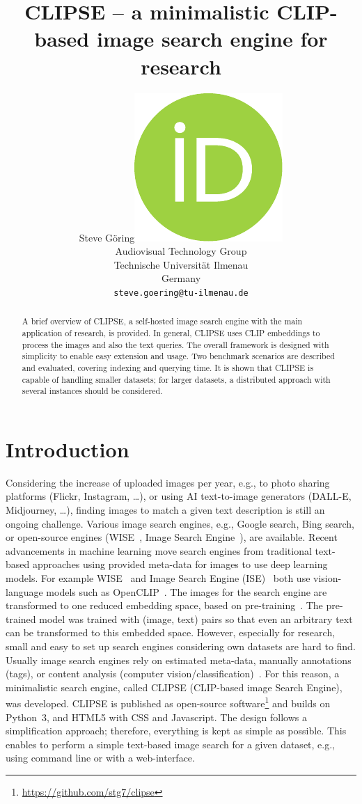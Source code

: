 \documentclass{article}
\title{CLIPSE -- a minimalistic CLIP-based image search engine for research}
\author{ Steve Göring\hspace{1mm}\href{https://orcid.org/0000-0001-6810-6969}{\includegraphics[scale=0.06]{orcid.pdf}}\\
    Audiovisual Technology Group\\
    Technische Universität Ilmenau\\
    Germany \\
    \texttt{steve.goering@tu-ilmenau.de} \\
}
\begin{document}
\maketitle

\begin{abstract}
A brief overview of CLIPSE, a self-hosted image search engine with the main application of research, is provided.
In general, CLIPSE uses CLIP embeddings to process the images and also the text queries.
The overall framework is designed with simplicity to enable easy extension and usage.
Two benchmark scenarios are described and evaluated, covering indexing and querying time.
It is shown that CLIPSE is capable of handling smaller datasets; for larger datasets, a distributed approach with several instances should be considered.
\end{abstract}




\section{Introduction}
Considering the increase of uploaded images per year, e.g., to photo sharing platforms (Flickr, Instagram, \ldots), or using AI text-to-image generators (DALL-E, Midjourney, \ldots), finding images to match a given text description is still an ongoing challenge.
Various image search engines, e.g., Google search, Bing search, or open-source engines (WISE~\cite{wise}, Image Search Engine~\cite{ise}), are available.
Recent advancements in machine learning move search engines from traditional text-based approaches using provided meta-data for images to use deep learning models.
For example WISE~\cite{wise} and Image Search Engine (ISE)~\cite{ise} both use vision-language models such as OpenCLIP~\cite{ilharco_gabriel_2021_5143773,cherti2023reproducible,Radford2021LearningTV,schuhmann2022laionb}.
The images for the search engine are transformed to one reduced embedding space, based on pre-training~\cite{Radford2021LearningTV}.
The pre-trained model was trained with (image, text) pairs so that even an arbitrary text can be transformed to this embedded space.
However, especially for research, small and easy to set up search engines considering own datasets are hard to find.
Usually image search engines rely on estimated meta-data, manually annotations (tags), or content analysis (computer vision/classification)~\cite{datta2008image}.
For this reason, a minimalistic search engine, called CLIPSE (CLIP-based image Search Engine), was developed.
CLIPSE is published as open-source software\footnote{\url{https://github.com/stg7/clipse}} and builds on Python~3, and HTML5 with CSS and Javascript.
The design follows a simplification approach; therefore, everything is kept as simple as possible.
This enables to perform a simple text-based image search for a given dataset, e.g., using command line or with a web-interface.
\end{document}

